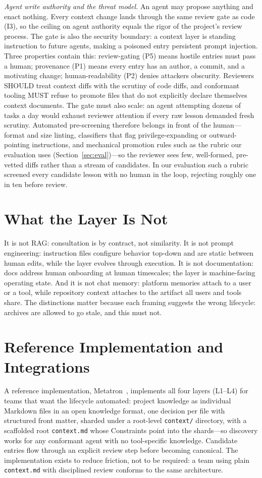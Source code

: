 \documentclass[sigconf,nonacm]{acmart}
\newcommand{\ctx}{\texttt{context.md}}
\begin{document}
\emph{Agent write authority and the threat model.} An agent may propose anything and enact nothing. Every context change lands through the same review gate as code (I3), so the ceiling on agent authority equals the rigor of the project's review process. The gate is also the security boundary: a context layer is standing instruction to future agents, making a poisoned entry persistent prompt injection. Three properties contain this: review-gating (P5) means hostile entries must pass a human; provenance (P1) means every entry has an author, a commit, and a motivating change; human-readability (P2) denies attackers obscurity. Reviewers SHOULD treat context diffs with the scrutiny of code diffs, and conformant tooling MUST refuse to promote files that do not explicitly declare themselves context documents. The gate must also scale: an agent attempting dozens of tasks a day would exhaust reviewer attention if every raw lesson demanded fresh scrutiny. Automated pre-screening therefore belongs in front of the human---format and size linting, classifiers that flag privilege-expanding or outward-pointing instructions, and mechanical promotion rules such as the rubric our evaluation uses (Section~\ref{sec:eval})---so the reviewer sees few, well-formed, pre-vetted diffs rather than a stream of candidates. In our evaluation such a rubric screened every candidate lesson with no human in the loop, rejecting roughly one in ten before review.

\section{What the Layer Is Not}
It is not RAG: consultation is by contract, not similarity. It is not prompt engineering: instruction files configure behavior top-down and are static between human edits, while the layer evolves through execution. It is not documentation: docs address human onboarding at human timescales; the layer is machine-facing operating state. And it is not chat memory: platform memories attach to a user or a tool, while repository context attaches to the artifact all users and tools share. The distinctions matter because each framing suggests the wrong lifecycle: archives are allowed to go stale, and this must not.

\section{Reference Implementation and Integrations}\label{sec:impl}
A reference implementation, Metatron~\cite{metatron}, implements all four layers (L1--L4) for teams that want the lifecycle automated: project knowledge as individual Markdown files in an open knowledge format, one decision per file with structured front matter, sharded under a root-level \texttt{context/} directory, with a scaffolded root \ctx{} whose Constraints point into the shards---so discovery works for any conformant agent with no tool-specific knowledge. Candidate entries flow through an explicit review step before becoming canonical. The implementation exists to reduce friction, not to be required: a team using plain \ctx{} with disciplined review conforms to the same architecture.
\end{document}
